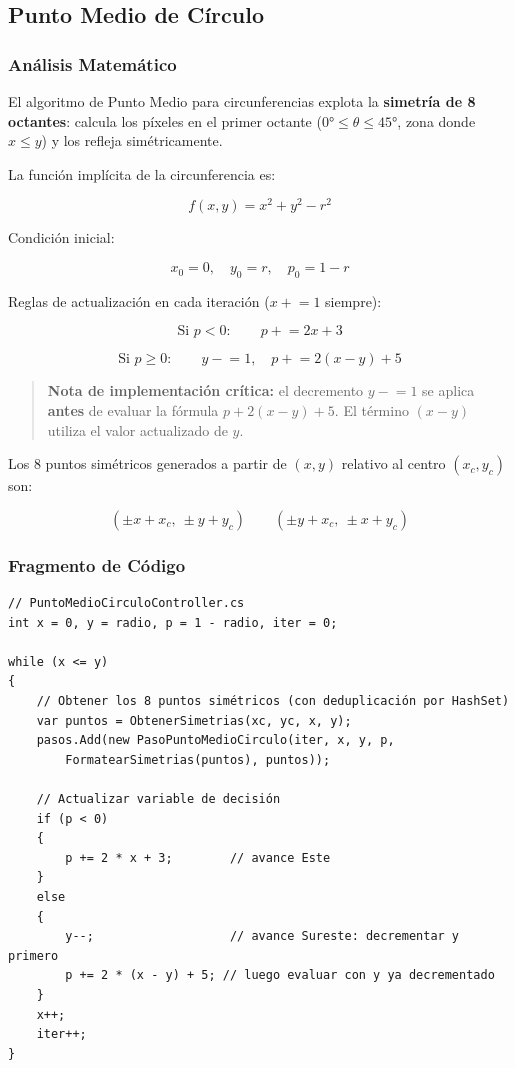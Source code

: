\documentclass[
  spanish,
  a4paper,
  12pt,
]{article}
\begin{document}
\subsection{Punto Medio de
Círculo}\label{punto-medio-de-cuxedrculo}

\subsubsection{Análisis
Matemático}\label{anuxe1lisis-matemuxe1tico-3}

El algoritmo de Punto Medio para circunferencias explota la
\textbf{simetría de 8 octantes}: calcula los píxeles en el primer
octante (\(0° \leq \theta \leq 45°\), zona donde \(x \leq y\)) y los
refleja simétricamente.

La función implícita de la circunferencia es:

\[f(x, y) = x^2 + y^2 - r^2\]

Condición inicial:

\[x_0 = 0, \quad y_0 = r, \quad p_0 = 1 - r\]

Reglas de actualización en cada iteración (\(x \mathrel{+}= 1\)
siempre):

\[\text{Si } p < 0: \qquad p \mathrel{+}= 2x + 3\]

\[\text{Si } p \geq 0: \qquad y \mathrel{-}= 1, \quad p \mathrel{+}= 2(x - y) + 5\]

\begin{quote}
\textbf{Nota de implementación crítica:} el decremento
\(y \mathrel{-}= 1\) se aplica \textbf{antes} de evaluar la fórmula
\(p + 2(x-y)+5\). El término \((x-y)\) utiliza el valor actualizado de
\(y\).
\end{quote}

Los 8 puntos simétricos generados a partir de \((x, y)\) relativo al
centro \((x_c, y_c)\) son:

\[(\pm x + x_c,\ \pm y + y_c) \qquad (\pm y + x_c,\ \pm x + y_c)\]

\newpage

\subsubsection{Fragmento de Código}\label{fragmento-de-cuxf3digo-3}

\begin{lstlisting}
// PuntoMedioCirculoController.cs
int x = 0, y = radio, p = 1 - radio, iter = 0;

while (x <= y)
{
    // Obtener los 8 puntos simétricos (con deduplicación por HashSet)
    var puntos = ObtenerSimetrias(xc, yc, x, y);
    pasos.Add(new PasoPuntoMedioCirculo(iter, x, y, p,
        FormatearSimetrias(puntos), puntos));

    // Actualizar variable de decisión
    if (p < 0)
    {
        p += 2 * x + 3;        // avance Este
    }
    else
    {
        y--;                   // avance Sureste: decrementar y primero
        p += 2 * (x - y) + 5; // luego evaluar con y ya decrementado
    }
    x++;
    iter++;
}
\end{lstlisting}
\end{document}
